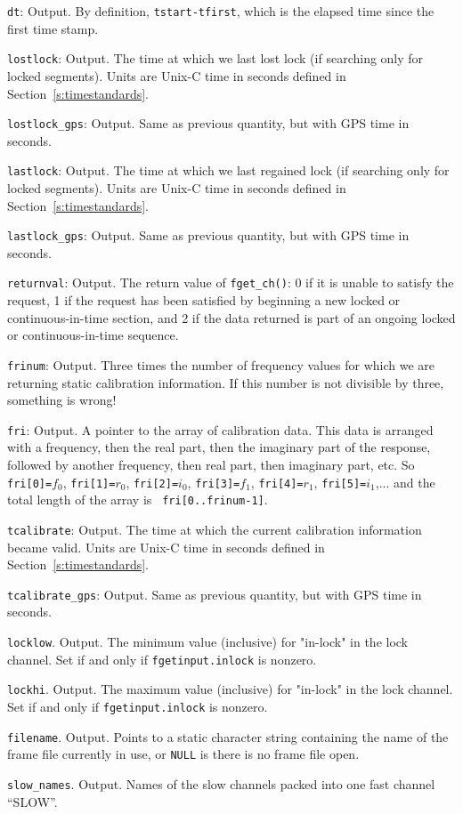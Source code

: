 \begin{description}
\item{\tt  dt}: Output.  By definition, {\tt tstart-tfirst}, which is the elapsed time since the first time stamp.
\item{\tt  lostlock}: Output.  The time at which we last lost lock (if searching only for locked segments).
Units are Unix-C time in seconds  defined in Section~\ref{s:timestandards}.
\item{\tt  lostlock\_gps}: Output.  Same as previous quantity, but with GPS time in seconds.
\item{\tt  lastlock}: Output.  The time at which we last regained lock (if searching only for locked segments).
Units are Unix-C time in seconds  defined in Section~\ref{s:timestandards}.
\item{\tt  lastlock\_gps}: Output.  Same as previous quantity, but with GPS time in seconds.
\item{\tt  returnval}: Output.  The return value of  {\tt fget\_ch()}:
  0 if it is unable to satisfy the request, 1 if the request has been
  satisfied by beginning a new locked or continuous-in-time section, and 2
  if the data returned is part of an ongoing locked or continuous-in-time
  sequence.
\item{\tt  frinum}: Output.  Three times the number of frequency values for which we are returning static calibration
    information.  If this number is not divisible by three, something is wrong!
\item{\tt  fri}: Output.  A pointer to the array of calibration data.  This data is arranged
 with a frequency, then the real part, then the imaginary part of
 the response, followed by another frequency, then real part, then
 imaginary part, etc.  So {\tt fri[0]=}$f_0$, {\tt fri[1]=}$r_0$,
 {\tt fri[2]=}$i_0$, {\tt fri[3]=}$f_1$, {\tt fri[4]=}$r_1$,
 {\tt fri[5]=}$i_1$,... and the total length of the array is {\tt
 fri[0..frinum-1]}.
\item{\tt  tcalibrate}: Output.  The time at which the current calibration information became valid.
Units are Unix-C time in seconds  defined in Section~\ref{s:timestandards}.
\item{\tt  tcalibrate\_gps}: Output.  Same as previous quantity, but with GPS time in seconds.
\item{\tt locklow}.  Output.  The minimum value (inclusive) for "in-lock" in the lock channel.
Set if and only if {\tt fgetinput.inlock} is nonzero.
\item{\tt lockhi}.  Output.  The maximum value (inclusive) for "in-lock" in the lock channel.
Set if and only if {\tt fgetinput.inlock} is nonzero.
\item{\tt filename}.  Output.  Points to a static character string containing
the name of the frame file currently in use, or {\tt NULL} is there is no
frame file open.
\item{\tt slow\_names}. Output. Names of the slow channels packed into one fast channel ``SLOW''.
\end{description}

